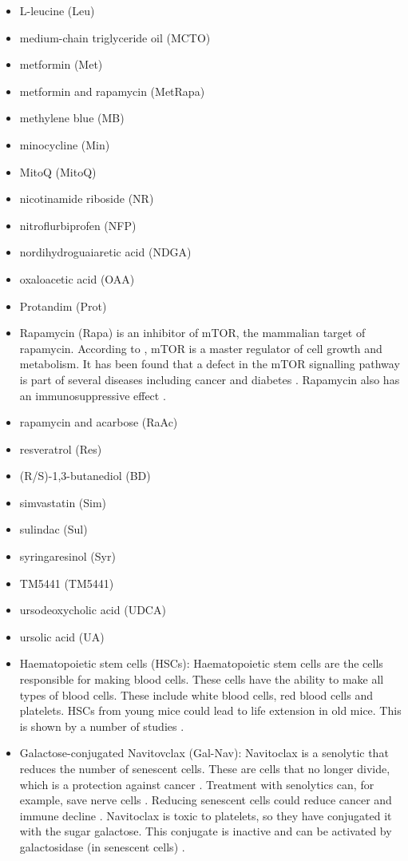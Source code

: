 \begin{itemize}
    \item L-leucine (Leu)
    \item medium-chain triglyceride oil (MCTO)
    \item metformin (Met)
    \item metformin and rapamycin (MetRapa)
    \item methylene blue (MB)
    \item minocycline (Min)
    \item MitoQ (MitoQ)
    \item nicotinamide riboside (NR)
    \item nitroflurbiprofen (NFP)
    \item nordihydroguaiaretic acid (NDGA)
    \item oxaloacetic acid (OAA)
    \item Protandim (Prot)
    \item Rapamycin (Rapa) is an inhibitor of mTOR, the mammalian target of rapamycin. According to \citet{li2014rapamycin}, mTOR is a master regulator of cell growth and metabolism. It has been found that a defect in the mTOR signalling pathway is part of several diseases including cancer and diabetes \cite{li2014rapamycin}. Rapamycin also has an immunosuppressive effect \cite{saunders2001rapamycin}.
    \item rapamycin and acarbose (RaAc)
    \item resveratrol (Res)
    \item (R/S)-1,3-butanediol (BD)
    \item simvastatin (Sim)
    \item sulindac (Sul)
    \item syringaresinol (Syr)
    \item TM5441 (TM5441)
    \item ursodeoxycholic acid (UDCA)
    \item ursolic acid (UA)
    
    \item Haematopoietic stem cells (HSCs): Haematopoietic stem cells are the cells responsible for making blood cells. These cells have the ability to make all types of blood cells. These include white blood cells, red blood cells and platelets. HSCs from young mice could lead to life extension in old mice. This is shown by a number of studies \cite{levf_update1}\cite{robust_mouse_study_1}.
    
    \item Galactose-conjugated Navitovclax (Gal-Nav): Navitoclax is a senolytic that reduces the number of senescent cells. These are cells that no longer divide, which is a protection against cancer \cite{collado2007cellular}. Treatment with senolytics can, for example, save nerve cells \cite{wagner2023aging}. Reducing senescent cells could reduce cancer and immune decline \cite{robust_mouse_study_1}. Navitoclax is toxic to platelets, so they have conjugated it with the sugar galactose. This conjugate is inactive and can be activated by galactosidase (in senescent cells) \cite{levf_update1}.
    

\end{itemize}
